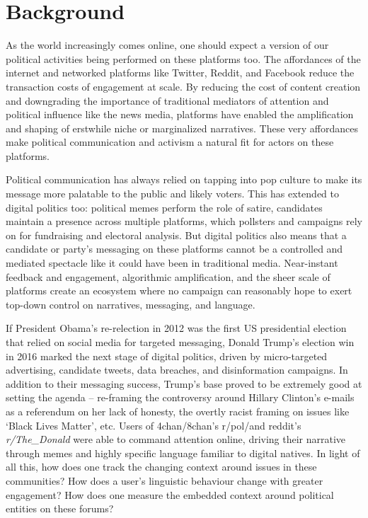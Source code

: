 \section{Background}


As the world increasingly comes online, one should expect a version of our political activities being performed on these platforms too. The affordances of the internet and networked platforms like Twitter, Reddit, and Facebook reduce the transaction costs of engagement at scale. By reducing the cost of content creation and downgrading the importance of traditional mediators of attention and political influence like the news media, platforms have enabled the amplification and shaping of erstwhile niche or marginalized narratives. These very affordances make political communication and activism a natural fit for actors on these platforms.

Political communication has always relied on tapping into pop culture to make its message more palatable to the public and likely voters. This has extended to digital politics too: political memes perform the role of satire, candidates maintain a presence across multiple platforms, which pollsters and campaigns rely on for fundraising and electoral analysis. But digital politics also means that a candidate or party's messaging on these platforms cannot be a controlled and mediated spectacle like it could have been in traditional media. Near-instant feedback and engagement, algorithmic amplification, and the sheer scale of platforms create an ecosystem where no campaign can reasonably hope to exert top-down control on narratives, messaging, and language. 

If President Obama's re-relection in 2012 was the first US presidential election that relied on social media for targeted messaging, Donald Trump's election win in 2016 marked the next stage of digital politics, driven by micro-targeted advertising, candidate tweets, data breaches, and disinformation campaigns. In addition to their messaging success, Trump's base proved to be extremely good at setting the agenda -- re-framing the controversy around Hillary Clinton's e-mails as a referendum on her lack of honesty, the overtly racist framing on issues like `Black Lives Matter', etc. Users of 4chan/8chan's r/pol/and reddit's \textit{r/The\_Donald} were able to command attention online, driving their narrative through memes and highly specific language familiar to digital natives. In light of all this, how does one track the changing context around issues in these communities? How does a user's linguistic behaviour change with greater engagement? How does one measure the embedded context around political entities on these forums?   

